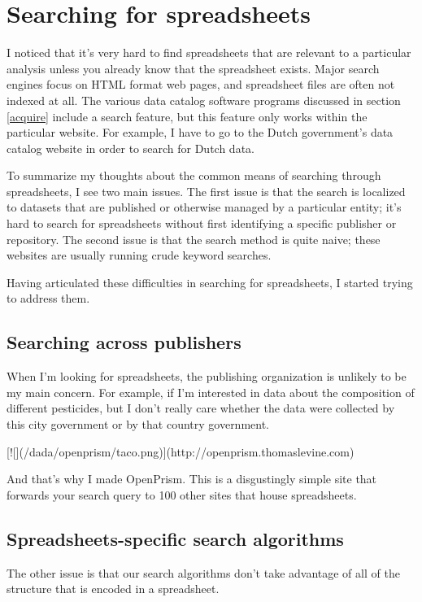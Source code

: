 \documentclass{acm_proc_article-sp}
\begin{document}
\section{Searching for spreadsheets}
I noticed that it's very hard to find spreadsheets that are relevant
to a particular analysis unless you already know that the spreadsheet exists.
Major search engines focus on HTML format web pages, and spreadsheet files
are often not indexed at all. The various data catalog software programs
discussed in section \ref{acquire} include a search feature, but this feature
only works within the particular website. For example, I have to go to the
Dutch government's data catalog website in order to search for Dutch data.

To summarize my thoughts about the common means of searching through
spreadsheets, I see two main issues.
The first issue is that the search is localized to datasets that are published
or otherwise managed by a particular entity; it's hard to search for
spreadsheets without first identifying a specific publisher or repository.
The second issue is that the search method is quite naive; these websites are
usually running crude keyword searches.

Having articulated these difficulties in searching for spreadsheets, I started
trying to address them.

\subsection{Searching across publishers}
When I'm looking for spreadsheets, the publishing organization is unlikely
to be my main concern. For example, if I'm interested in data about the
composition of different pesticides, but I don't really care whether the
data were collected by this city government or by that country government.


[![](/dada/openprism/taco.png)](http://openprism.thomaslevine.com)

And that's why I made OpenPrism. This is a disgustingly simple site that
forwards your search query to 100 other sites that house spreadsheets.

\subsection{Spreadsheets-specific search algorithms}
The other issue is that our search algorithms don't take advantage of all
of the structure that is encoded in a spreadsheet.
\end{document}
